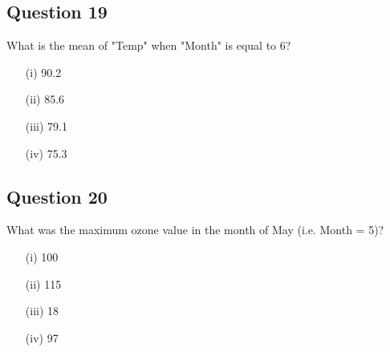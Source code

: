 \documentclass[12pt]{article}
\begin{document}
\subsection*{Question 19}
\Large
What is the mean of "Temp" when "Month" is equal to 6?

\begin{itemize}
	\item[(i)] 90.2
	\item[(ii)] 85.6
	\item[(iii)] 79.1
	\item[(iv)] 75.3
\end{itemize}

\subsection*{Question 20}
\Large
What was the maximum ozone value in the month of May (i.e. Month = 5)?


\begin{itemize}
	\item[(i)] 100
	\item[(ii)] 115
	\item[(iii)] 18
	\item[(iv)] 97
\end{itemize}
\end{document}
